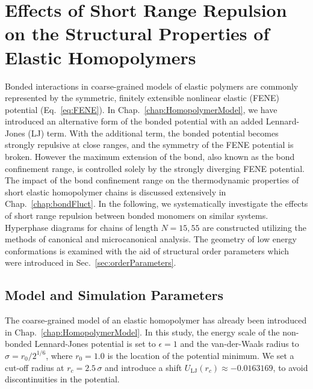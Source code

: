 \documentclass[12pt]{report}
\begin{document}

\chapter{Effects of Short Range Repulsion on the Structural Properties of Elastic Homopolymers}

Bonded interactions in coarse-grained models of elastic polymers are commonly represented by the symmetric, finitely extensible nonlinear elastic (FENE) potential (Eq.~\ref{eq:FENE}). In Chap.~\ref{chap:HomopolymerModel}, we have introduced an alternative form of the bonded potential with an added Lennard-Jones (LJ) term. With the additional term, the bonded potential becomes strongly repulsive at close ranges, and the symmetry of the FENE potential is broken. However the maximum extension of the bond, also known as the bond confinement range, is controlled solely by the strongly diverging FENE potential.  The impact of the bond confinement range on the thermodynamic properties of short elastic homopolymer chains is discussed extensively in Chap.~\ref{chap:bondFluct}. In the following, we systematically investigate the effects of short range repulsion between bonded monomers on similar systems. 
\newpage
\noindent
Hyperphase diagrams for chains of length $N = 15,55$ are constructed utilizing the methods of canonical and microcanonical analysis. The geometry of low energy conformations is examined with the aid of structural order parameters which were introduced in Sec.~\ref{sec:orderParameters}.

\section{Model and Simulation Parameters}
The coarse-grained model of an elastic homopolymer has already been introduced in Chap.~\ref{chap:HomopolymerModel}. In this study, the energy scale of the non-bonded Lennard-Jones potential is set to $\epsilon=1$ and the van-der-Waals radius to $\sigma=r_0/2^{1/6}$, where $r_0 = 1.0$ is the location of the potential minimum. We set a cut-off radius at $r_c=2.5\,\sigma$ and introduce a shift $U_{\mathrm{LJ}}(r_{c}) \approx -0.0163169$, to avoid discontinuities in the potential.
\end{document}
